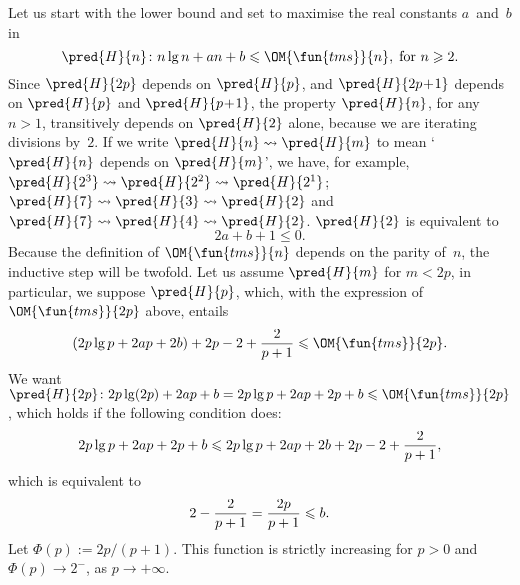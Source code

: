 Let us start with the lower bound and set to maximise the
real constants \(a\)~and~\(b\) in
\begin{equation*}
\abovedisplayskip=0pt
\belowdisplayskip=2pt
\pred{H}{n} \colon n\lg n + an + b \leqslant \OM{\fun{tms}}{n},
\; \text{for \(n \geqslant 2\).}
\end{equation*}
Since \(\pred{H}{2p}\) depends on \(\pred{H}{p}\), and
\(\pred{H}{2p\!+\!1}\) depends on \(\pred{H}{p}\) and
\(\pred{H}{p\!+\!1}\), the property \(\pred{H}{n}\), for any \(n>1\),
transitively depends on \(\pred{H}{2}\) alone, because we are
iterating divisions by~\(2\). If we write \(\pred{H}{n} \leadsto
\pred{H}{m}\) to mean `\(\pred{H}{n}\) depends on \(\pred{H}{m}\)', we
have, for example, \(\pred{H}{2^3} \leadsto \pred{H}{2^2} \leadsto
\pred{H}{2^1}\); \(\pred{H}{7} \leadsto \pred{H}{3} \leadsto
\pred{H}{2}\) and \(\pred{H}{7} \leadsto \pred{H}{4} \leadsto
\pred{H}{2}\). \(\pred{H}{2}\) is equivalent to
\begin{equation}
2a + b + 1 \leqslant 0.
\label{ineq:base_lower_Atms}
\end{equation}
Because the definition of \(\OM{\fun{tms}}{n}\) depends on the parity
of~\(n\), the inductive step will be twofold. Let us assume
\(\pred{H}{m}\) for \(m < 2p\), in particular, we suppose
\(\pred{H}{p}\), which, with the expression of \(\OM{\fun{tms}}{2p}\)
above, entails
\begin{equation*}
\abovedisplayskip=2pt
\belowdisplayskip=2pt
 (2p\lg p + 2ap + 2b) + 2p - 2 + \frac{2}{p+1} \leqslant \OM{\fun{tms}}{2p}.
\end{equation*}
We want \(\pred{H}{2p} \colon 2p\lg(2p) + 2ap + b
= 2p\lg p + 2ap + 2p + b \leqslant \OM{\fun{tms}}{2p}\), which holds
if the following condition does:
\begin{equation*}
\abovedisplayskip=0pt
\belowdisplayskip=2pt
2p\lg p + 2ap + 2p + b \leqslant 2p\lg p + 2ap + 2b + 2p - 2 + \frac{2}{p+1},
\end{equation*}
which is equivalent to
\begin{equation*}
\abovedisplayskip=0pt
\belowdisplayskip=2pt
2 - \frac{2}{p+1} = \frac{2p}{p+1} \leqslant b.
\end{equation*}
Let \(\Phi(p) := 2p/(p+1)\). This function is strictly increasing for
\(p > 0\) and \(\Phi(p) \to 2^{-}\), as \(p \to +\infty\).

